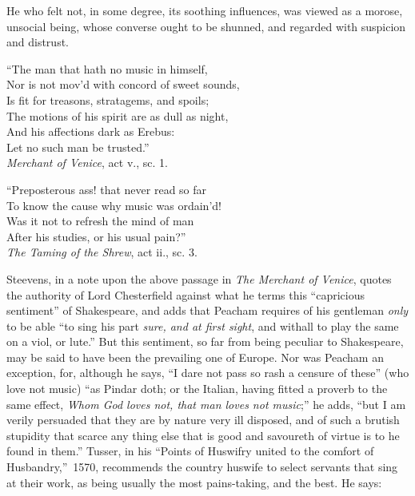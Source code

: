 He who felt not, in some degree, its soothing influences, was viewed as a
morose, unsocial being, whose converse ought to be shunned, and regarded with
suspicion and distrust.

\settowidth{\versewidth}{Nor is not mov’d with concord of sweet sounds,}
\begin{scverse}
“The man that hath no music in himself,\\
Nor is not mov’d with concord of sweet sounds,\\
Is fit for treasons, stratagems, and spoils;\\
The motions of his spirit are as dull as night,\\
And his affections dark as Erebus:\\
Let no such man be trusted.”\\
\vin\vin\vin\vin\textit{Merchant of Venice}, act v., sc. 1.

“Preposterous ass! that never read so far\\
To know the cause why music was ordain’d!\\
Was it not to refresh the mind of man\\
After his studies, or his usual pain?”\\
\vin\vin\vin\vin\textit{The Taming of the Shrew}, act ii., sc. 3.
\end{scverse}
\pagebreak


Steevens, in a note upon the above passage in \textit{The Merchant of Venice}, quotes the
authority of Lord Chesterfield against what he terms this “capricious sentiment”
of Shakespeare, and adds that Peacham requires of his gentleman \textit{only} to be able
“to sing his part \textit{sure, and at first sight}, and withall to play the same on a viol,
or lute.” But this sentiment, so far from being peculiar to Shakespeare, may be
said to have been the prevailing one of Europe. Nor was Peacham an exception,
for, although he says, “I dare not pass so rash a censure of these” (who love not
music) “as Pindar doth; or the Italian, having fitted a proverb to the same effect,
\textit{Whom God loves not, that man loves not music};” he adds, “but I am verily persuaded
that they are by nature very ill disposed, and of such a brutish stupidity
that scarce any thing else that is good and savoureth of virtue is to he found
in them.”
Tusser, in his “Points of Huswifry united to the comfort of
Husbandry,”~1570, recommends the country huswife to select servants that sing
at their work, as being usually the most pains-taking, and the best. He says:

